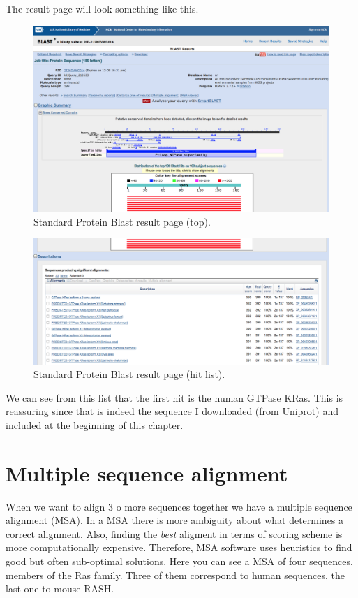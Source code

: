 \documentclass[]{book}
\theoremstyle{definition}
\theoremstyle{definition}
\theoremstyle{definition}
\theoremstyle{remark}
\begin{document}
The result page will look something like this.

\begin{figure}
\includegraphics[width=18.07in]{pic/blast_result_1} \caption{Standard Protein Blast result page (top).}\label{fig:unnamed-chunk-7}
\end{figure}

\begin{figure}
\includegraphics[width=18.08in]{pic/blast_result_2} \caption{Standard Protein Blast result page (hit list).}\label{fig:unnamed-chunk-8}
\end{figure}

We can see from this list that the first hit is the human GTPase KRas.
This is reassuring since that is indeed the sequence I downloaded
(\href{http://www.uniprot.org/uniprot/P01116}{from Uniprot}) and
included at the beginning of this chapter.

\section{Multiple sequence alignment}\label{multiple-sequence-alignment}

When we want to align 3 o more sequences together we have a multiple
sequence alignment (MSA). In a MSA there is more ambiguity about what
determines a correct alignment. Also, finding the \emph{best} aligment
in terms of scoring scheme is more computationally expensive. Therefore,
MSA software uses heuristics to find good but often sub-optimal
solutions. Here you can see a MSA of four sequences, members of the Ras
family. Three of them correspond to human sequences, the last one to
mouse RASH.
\end{document}
